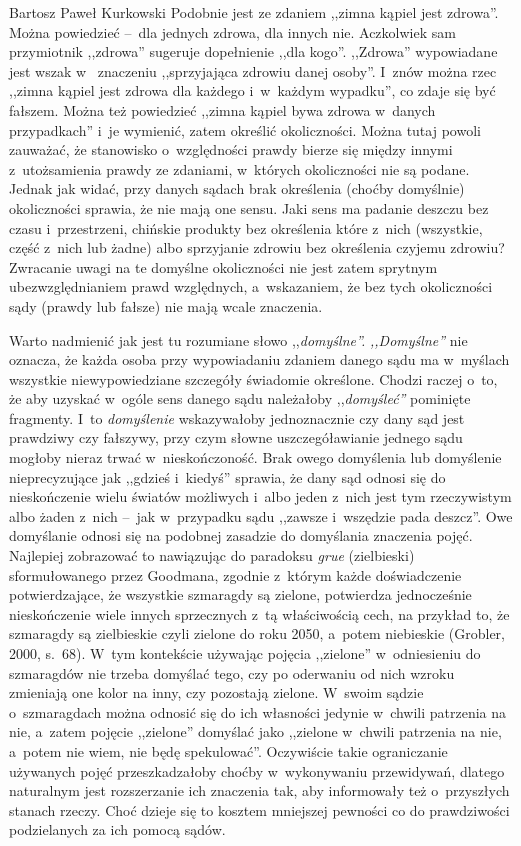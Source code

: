 \begin{artplenv}{Bartosz Paweł Kurkowski}
Podobnie jest ze zdaniem ,,zimna kąpiel jest zdrowa''. Można powiedzieć --~dla jednych zdrowa, dla innych nie. Aczkolwiek
sam przymiotnik ,,zdrowa'' sugeruje dopełnienie ,,dla kogo''. ,,Zdrowa'' wypowiadane jest wszak w~ znaczeniu ,,sprzyjająca
zdrowiu danej osoby''. I~znów można rzec ,,zimna kąpiel jest zdrowa dla każdego i~w~każdym wypadku'', co zdaje się być
fałszem. Można też powiedzieć ,,zimna kąpiel bywa zdrowa w~danych przypadkach'' i~je wymienić, zatem określić
okoliczności. Można tutaj powoli zauważać, że stanowisko o~względności prawdy bierze się między innymi z~utożsamienia
prawdy ze zdaniami, w~których okoliczności nie są podane. Jednak jak widać, przy danych sądach brak określenia (choćby
domyślnie) okoliczności sprawia, że nie mają one sensu. Jaki sens ma padanie deszczu bez czasu i~przestrzeni, chińskie
produkty bez określenia które z~nich (wszystkie, część z~nich lub żadne) albo sprzyjanie zdrowiu bez określenia czyjemu
zdrowiu? Zwracanie uwagi na te domyślne okoliczności nie jest zatem sprytnym ubezwzględnianiem prawd
względnych, a~wskazaniem, że bez tych okoliczności sądy (prawdy lub fałsze) nie mają wcale znaczenia.


Warto nadmienić jak jest tu rozumiane słowo ,,\textit{domyślne''.} \textit{,,Domyślne''} nie oznacza, że każda osoba przy
wypowiadaniu zdaniem danego sądu ma w~myślach wszystkie niewypowiedziane szczegóły świadomie określone. Chodzi
raczej o~to, że aby uzyskać w~ogóle sens danego sądu należałoby ,,\textit{domyśleć'' }pominięte fragmenty.
I~to \textit{domyślenie}
wskazywałoby jednoznacznie czy dany sąd jest prawdziwy czy fałszywy, przy czym słowne uszczegóławianie jednego sądu
mogłoby nieraz trwać w~nieskończoność. Brak owego domyślenia lub domyślenie nieprecyzujące jak ,,gdzieś i~kiedyś''
sprawia, że dany sąd odnosi się do nieskończenie wielu światów możliwych i~albo jeden z~nich jest tym rzeczywistym albo
żaden z~nich --~jak w~przypadku sądu ,,zawsze i~wszędzie pada deszcz''. Owe domyślanie odnosi się na podobnej zasadzie do
domyślania znaczenia pojęć. Najlepiej zobrazować to nawiązując do paradoksu \textit{grue }(zielbieski) sformułowanego
przez Goodmana, zgodnie z~którym każde doświadczenie potwierdzające, że wszystkie szmaragdy są zielone, potwierdza
jednocześnie nieskończenie wiele innych sprzecznych z~tą właściwością cech, na przykład to, że szmaragdy są zielbieskie
czyli zielone do roku 2050, a~potem niebieskie \label{ref:RNDifYrkWHWLD}(Grobler, 2000, s.~68). W~tym kontekście
używając pojęcia ,,zielone'' w~odniesieniu do szmaragdów nie trzeba domyślać tego, czy po oderwaniu od nich wzroku
zmieniają one kolor na inny, czy pozostają zielone. W~swoim sądzie o~szmaragdach można odnosić się do ich własności
jedynie w~chwili patrzenia na nie, a~zatem pojęcie ,,zielone'' domyślać jako ,,zielone w~chwili patrzenia na
nie, a~potem nie wiem, nie będę spekulować''. Oczywiście takie ograniczanie używanych pojęć przeszkadzałoby
choćby w~wykonywaniu
przewidywań, dlatego naturalnym jest rozszerzanie ich znaczenia tak, aby informowały też o~przyszłych stanach rzeczy.
Choć dzieje się to kosztem mniejszej pewności co do prawdziwości podzielanych za ich pomocą sądów.



\end{artplenv}
